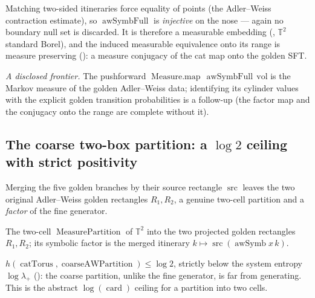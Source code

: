 \begin{theorem}\label{injective_awSymbFull}
  \leanok
  Matching two-sided itineraries force equality of points (the Adler--Weiss contraction estimate), so
  \(\operatorname{awSymbFull}\) is \emph{injective} on the nose --- again no boundary null set is
  discarded. It is therefore a measurable embedding
  (, \(\mathbb{T}^2\) standard Borel),
  and the induced measurable equivalence onto its range is measure preserving
  (): a measure conjugacy of the
  cat map onto the golden SFT.
\end{theorem}

\emph{A disclosed frontier.} The pushforward \(\operatorname{Measure.map}\,\operatorname{awSymbFull}
\,\mathrm{vol}\) is the Markov measure of the golden Adler--Weiss data; identifying its cylinder
values with the explicit golden transition probabilities is a follow-up (the factor map and the
conjugacy onto the range are complete without it).

\subsection{The coarse two-box partition: a \(\log 2\) ceiling with strict positivity}

Merging the five golden branches by their source rectangle \(\operatorname{src}\) leaves the two
original Adler--Weiss golden rectangles \(R_1, R_2\), a genuine two-cell partition and a
\emph{factor} of the fine generator.

\begin{definition}\label{coarseAWPartition}
  \leanok
  The two-cell \(\operatorname{MeasurePartition}\) of \(\mathbb{T}^2\) into the two projected golden
  rectangles \(R_1, R_2\); its symbolic factor is the merged itinerary
  \(k\mapsto\operatorname{src}(\operatorname{awSymb} x\,k)\).
\end{definition}

\begin{theorem}\label{coarseAWPartition_ksEntropy_le}
  \leanok
  \(h(\operatorname{catTorus}, \operatorname{coarseAWPartition})\le\log 2\), strictly below the system
  entropy \(\log\lambda_+\) (): the coarse
  partition, unlike the fine generator, is far from generating. This is the abstract
  \(\log(\operatorname{card})\) ceiling for a partition into two cells.
\end{theorem}

